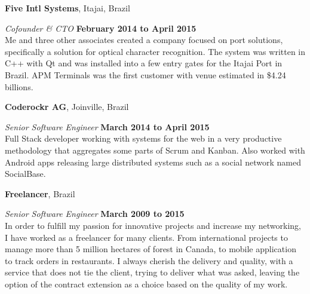 \documentclass[12pt]{article}
\newcommand{\halfblankline}{\quad\vspace{-0.5\baselineskip}\pagebreak[3]}
\begin{document}
\halfblankline

\textbf{Five Intl Systems},
Itajai, Brazil
\begin{outerlist}

    \item[] \textit{Cofounder \& CTO}%
            \hfill \textbf{February 2014 to April 2015}\\
			Me and three other associates created a company focused on port solutions, specifically a solution for optical character recognition. The system was written in C++ with Qt and was installed into a few entry gates for the Itajai Port in Brazil. APM Terminals was the first customer with venue estimated in \$4.24 billions.
			
\end{outerlist}

\halfblankline

\textbf{Coderockr AG},
Joinville, Brazil
\begin{outerlist}

    \item[] \textit{Senior Software Engineer}%
            \hfill \textbf{March 2014 to April 2015}\\
			Full Stack developer working with systems for the web in a very productive methodology that aggregates some parts of Scrum and Kanban. Also worked with Android apps releasing large distributed systems such as a social network named SocialBase.
			
\end{outerlist}

\halfblankline

\textbf{Freelancer},
Brazil
\begin{outerlist}

    \item[] \textit{Senior Software Engineer}%
            \hfill \textbf{March 2009 to 2015}\\
			In order to fulfill my passion for innovative projects and increase my networking, I have worked as a freelancer for many clients. From international projects to manage more than 5 million hectares of forest in Canada, to mobile application to track orders in restaurants. I always cherish the delivery and quality, with a service that does not tie the client, trying to deliver what was asked, leaving the option of the contract extension as a choice based on the quality of my work.
			
\end{outerlist}

\halfblankline
\end{document}
